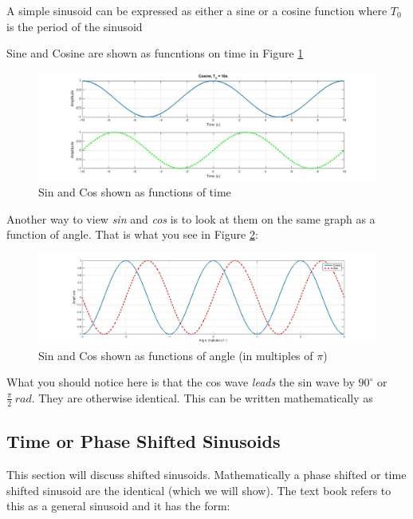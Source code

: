 \documentclass{handout}
\begin{document}
A simple sinusoid can be expressed as either a sine or a cosine function
where $T_0$ is the period of the sinusoid

Sine and Cosine are shown as funcntions on time in Figure \ref{fig: SinCos_1}
\begin{figure} [h!]
\centering
\includegraphics[width=1\textwidth]{SinCos_1.jpg}
\caption{Sin and Cos shown as functions of time}
\label{fig: SinCos_1}
\end{figure}

Another way to view {\em sin} and {\em cos} is to look at them on the same graph as a function of angle.  That is what you see in Figure \ref{fig: SinCos_2}:

\begin{figure} [h!]
\centering
\includegraphics[width=1\textwidth]{SinCos_2.jpg}
\caption{Sin and Cos shown as functions of angle (in multiples of $\pi$)}
\label{fig: SinCos_2}
\end{figure}
What you should notice here is that the cos wave {\em leads} the sin wave by $90 ^\circ$ or $\frac{\pi}{2}\ rad$.  They are otherwise identical.  This can be written mathematically as

\subsection{Time or Phase Shifted Sinusoids}
This section will discuss shifted sinusoids.  Mathematically a phase shifted or time shifted sinusoid are the identical (which we will show).  The text book refers to this as a general sinusoid and it has the form:
\end{document}
